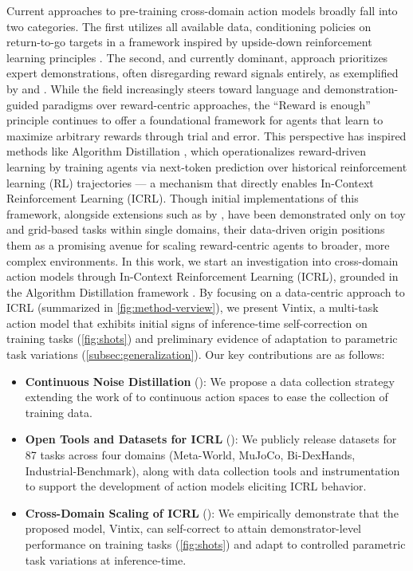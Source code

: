 \documentclass{article}
\theoremstyle{plain}
\theoremstyle{definition}
\theoremstyle{remark}
\begin{document}
Current approaches to pre-training cross-domain action models broadly fall into two categories. The first utilizes all available data, conditioning policies on return-to-go targets in a framework inspired by upside-down reinforcement learning principles \cite{schmidhuber2019reinforcement, lee2022multi, schmied2024large}. The second, and currently dominant, approach prioritizes expert demonstrations, often disregarding reward signals entirely, as exemplified by \citet{reed2022generalistagent} and \citet{haldar2024bakuefficienttransformermultitask}.
While the field increasingly steers toward language and demonstration-guided paradigms over reward-centric approaches, the “Reward is enough” principle \cite{silver2021reward} continues to offer a foundational framework for agents that learn to maximize arbitrary rewards through trial and error. This perspective has inspired methods like Algorithm Distillation \cite{laskin2022incontextreinforcementlearningalgorithm}, which operationalizes reward-driven learning by training agents via next-token prediction over historical reinforcement learning (RL) trajectories — a mechanism that directly enables In-Context Reinforcement Learning (ICRL). Though initial implementations of this framework, alongside extensions such as by \citet{zisman2024emergenceincontextreinforcementlearning, zisman2024ngraminductionheadsincontext, sinii2024incontextreinforcementlearningvariable, nikulin2024xland100blargescalemultitaskdataset}, have been demonstrated only on toy and grid-based tasks within single domains, their data-driven origin positions them as a promising avenue for scaling reward-centric agents to broader, more complex environments.
In this work, we start an investigation into cross-domain action models through In-Context Reinforcement Learning (ICRL), grounded in the Algorithm Distillation framework \cite{laskin2022incontextreinforcementlearningalgorithm}. By focusing on a data-centric approach to ICRL (summarized in \cref{fig:method-verview}), we present Vintix, a multi-task action model that exhibits initial signs of inference-time self-correction on training tasks (\cref{fig:shots}) and preliminary evidence of adaptation to parametric task variations (\cref{subsec:generalization}).
Our key contributions are as follows:
\begin{itemize}
    \item \textbf{Continuous Noise Distillation} (): We propose a data collection strategy extending the work of \citet{zisman2024emergenceincontextreinforcementlearning} to continuous action spaces to ease the collection of training data.
    \item \textbf{Open Tools and Datasets for ICRL} (): We publicly release datasets for 87 tasks across four domains (Meta-World, MuJoCo, Bi-DexHands, Industrial-Benchmark), along with data collection tools and instrumentation to support the development of action models eliciting ICRL behavior.
    \item \textbf{Cross-Domain Scaling of ICRL} (): We empirically demonstrate that the proposed model, Vintix, can self-correct to attain demonstrator-level performance on training tasks (\cref{fig:shots}) and adapt to controlled parametric task variations at inference-time.
\end{itemize}
\end{document}
